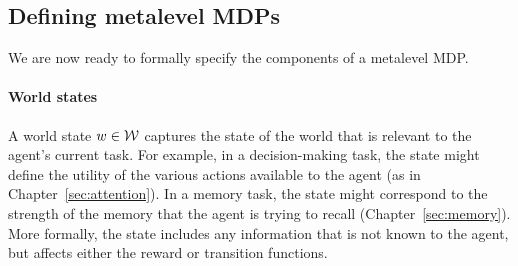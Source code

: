 \subsection{Defining metalevel MDPs}

We are now ready to formally specify the components of a metalevel MDP.






\paragraph{World states}
A world state $w \in \mathcal{W}$ captures the state of the world that is relevant to the agent's current task. For example, in a decision-making task, the state might define the utility of the various actions available to the agent (as in Chapter~\ref{sec:attention}). In a memory task, the state might correspond to the strength of the memory that the agent is trying to recall (Chapter~\ref{sec:memory}). More formally, the state includes any information that is not known to the agent, but affects either the reward or transition functions.

